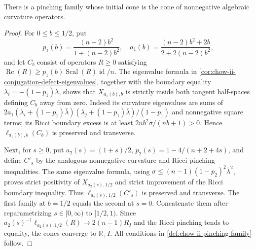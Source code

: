 \begin{theorem}
  \label{thm:chow-ii-pinching-family-nonnegative-curvature}
  There is a pinching family whose initial cone is the cone of nonnegative
  algebraic curvature operators.
\end{theorem}
\begin{proof}
\sketch
  For \(0\le b\le1/2\), put
  \[
  p_1(b)=\frac{(n-2)b^2}{1+(n-2)b^2},\quad
  a_1(b)=\frac{(n-2)b^2+2b}{2+2(n-2)b^2},
  \]
  and let \(C_b\) consist of operators \(R\ge0\) satisfying
  \(\operatorname{Rc}(R)\ge p_1(b)\operatorname{Scal}(R)\operatorname{id}/n\).
  The eigenvalue formula in
  \ref{cor:chow-ii-conjugation-defect-eigenvalues}, together with the boundary
  equality \(\lambda_i=-(1-p_1)\bar\lambda\), shows that
  \(X_{a_1(b),b}\) is strictly inside both tangent half-spaces defining
  \(C_b\) away from zero.  Indeed its curvature eigenvalues are sums of
  \(2a_1(\lambda_i+(1-p_1)\bar\lambda)
  (\lambda_j+(1-p_1)\bar\lambda)/(1-p_1)\) and nonnegative square terms;
  its Ricci boundary excess is at least
  \(2nb^2\sigma/(nb+1)>0\).  Hence
  \(\ell_{a_1(b),b}(C_b)\) is preserved and transverse.

  Next, for \(s\ge0\), put
  \(a_2(s)=(1+s)/2\), \(p_2(s)=1-4/(n+2+4s)\), and define \(C'_s\) by the
  analogous nonnegative-curvature and Ricci-pinching inequalities.  The same
  eigenvalue formula, using
  \(\sigma\le(n-1)(1-p_2)^2\bar\lambda^2\), proves strict positivity of
  \(X_{a_2(s),1/2}\) and strict improvement of the Ricci boundary inequality.
  Thus \(\ell_{a_2(s),1/2}(C'_s)\) is preserved and transverse.  The first
  family at \(b=1/2\) equals the second at \(s=0\).  Concatenate them after
  reparametrizing \(s\in[0,\infty)\) to \([1/2,1)\).  Since
  \(a_2(s)^{-1}\ell_{a_2(s),1/2}(R)\to2(n-1)R_I\) and the Ricci pinching tends
  to equality, the cones converge to \(\mathbb R_+I\).  All conditions in
  \ref{def:chow-ii-pinching-family} follow.
\end{proof}

